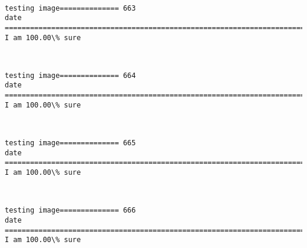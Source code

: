 \documentclass[11pt]{article}
\begin{document}
    \begin{center}
    \end{center}
    { \hspace*{\fill} \\}
    
    \begin{Verbatim}[commandchars=\\\{\}]
testing image============== 663
date
============================================================================
I am 100.00\% sure

    \end{Verbatim}

    \begin{center}
    \end{center}
    { \hspace*{\fill} \\}
    
    \begin{Verbatim}[commandchars=\\\{\}]
testing image============== 664
date
============================================================================
I am 100.00\% sure

    \end{Verbatim}

    \begin{center}
    \end{center}
    { \hspace*{\fill} \\}
    
    \begin{Verbatim}[commandchars=\\\{\}]
testing image============== 665
date
============================================================================
I am 100.00\% sure

    \end{Verbatim}

    \begin{center}
    \end{center}
    { \hspace*{\fill} \\}
    
    \begin{Verbatim}[commandchars=\\\{\}]
testing image============== 666
date
============================================================================
I am 100.00\% sure

    \end{Verbatim}
\end{document}
